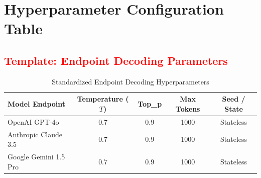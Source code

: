 
\chapter{Hyperparameter Configuration Table}
\label{app:hyperparameters}


\section{\textcolor{red}{Template: Endpoint Decoding Parameters}}

\begin{table}[htbp]
  \centering
  \caption{Standardized Endpoint Decoding Hyperparameters}
  \label{tab:decoding_params}
  \begin{tabular}{lcccc}
    \hline
    \textbf{Model Endpoint} & \textbf{Temperature ($T$)} & \textbf{Top\_p} & \textbf{Max Tokens} & \textbf{Seed / State} \\
    \hline
    OpenAI GPT-4o          & 0.7 & 0.9 & 1000 & Stateless \\
    Anthropic Claude 3.5   & 0.7 & 0.9 & 1000 & Stateless \\
    Google Gemini 1.5 Pro  & 0.7 & 0.9 & 1000 & Stateless \\
    \hline
  \end{tabular}
\end{table}